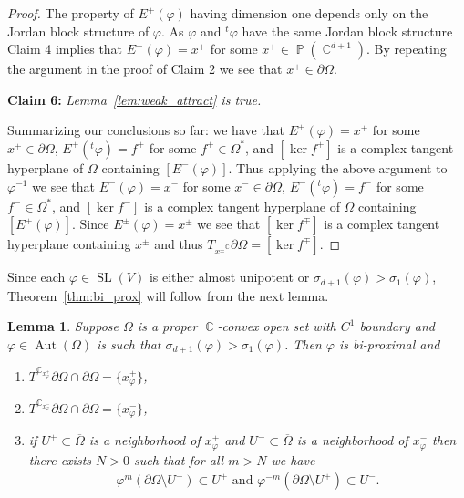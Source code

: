 \documentclass[12pt]{amsart}
\theoremstyle{plain}
\newtheorem{lemma}[proposition]{Lemma}
\theoremstyle{definition}
\theoremstyle{remark}
\begin{document}
\begin{proof}
The property of $E^+(\varphi)$ having dimension one depends only on the Jordan block structure of $\varphi$. As $\varphi$ and $^t\varphi$ have the same Jordan block structure Claim 4 implies that $E^+(\varphi) = x^+$ for some $x^+ \in \operatorname{\mathbb{P}}(\operatorname{\mathbb{C}}^{d+1})$. By repeating the argument in the proof of Claim 2 we see that $x^+ \in \partial \Omega$. 

\vspace*{5pt} \noindent \textbf{Claim 6:} \textit{Lemma~\ref{lem:weak_attract} is true. }\vspace*{5pt}

Summarizing our conclusions so far: we have that $E^+(\varphi)=x^+$ for some $x^+\in \partial \Omega$, $E^+(^t\varphi)=f^+$ for some $f^+ \in \Omega^*$, and $[\ker f^+]$ is a complex tangent hyperplane of $\Omega$ containing $[E^-(\varphi)]$. Thus applying the above argument to $\varphi^{-1}$ we see that $E^-(\varphi)=x^-$ for some $x^- \in \partial \Omega$, $E^-(^t\varphi)=f^-$ for some $f^- \in \Omega^*$, and $[\ker f^-]$ is a complex tangent hyperplane of $\Omega$ containing $[E^+(\varphi)]$. Since $E^\pm(\varphi) = x^\pm$ we see that $[\ker f^\mp]$ is a complex tangent hyperplane containing $x^\pm$ and thus $T_{x^\pm}^\operatorname{\mathbb{C}} \partial \Omega = [\ker f^{\mp}]$.
\end{proof}

Since each $\varphi \in \operatorname{SL}(V)$ is either almost unipotent or $\sigma_{d+1}(\varphi) > \sigma_1(\varphi)$, Theorem~\ref{thm:bi_prox} will follow from the next lemma.

\begin{lemma}
Suppose $\Omega$ is a proper $\operatorname{\mathbb{C}}$-convex open set with $C^1$ boundary and $\varphi \in \operatorname{Aut}(\Omega)$ is such that $\sigma_{d+1}(\varphi ) > \sigma_1(\varphi )$. Then $\varphi $ is bi-proximal and
\begin{enumerate}
\item $T^\operatorname{\mathbb{C}}_{x_{\varphi }^+} \partial \Omega \cap \partial \Omega = \{ x_{\varphi }^+\}$, 
\item $T^\operatorname{\mathbb{C}}_{x_{\varphi }^-} \partial \Omega \cap \partial \Omega = \{ x_{\varphi }^-\}$,
\item if $U^+ \subset \overline{\Omega}$ is a neighborhood of $x^+_{\varphi }$ and $U^- \subset \overline{\Omega}$ is a neighborhood of $x^-_{\varphi }$ then there exists $N>0$ such that for all $m > N$ we have
\begin{align*}
\varphi ^m(\partial \Omega \setminus U^-) \subset U^+ \text{ and } \varphi ^{-m}(\partial \Omega \setminus U^+) \subset U^-.
\end{align*}
\end{enumerate}
\end{lemma}
\end{document}
